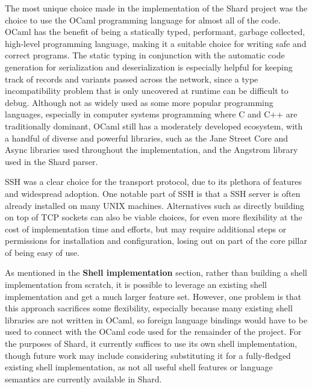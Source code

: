 \documentclass[twoside]{report}
\newcommand{\todoi}[1]{\todo[inline, color=blue!20]{TODO: {#1}}}
\begin{document}
The most unique choice made in the implementation of the Shard project was the choice to use the OCaml programming language for almost all of the code.
OCaml has the benefit of being a statically typed, performant, garbage collected, high-level programming language, making it a suitable choice for writing safe and correct programs.
The static typing in conjunction with the automatic code generation for serialization and deserialization is especially helpful for keeping track of records and variants passed across the network, since a type incompatibility problem that is only uncovered at runtime can be difficult to debug.
Although not as widely used as some more popular programming languages, especially in computer systems programming where C and C++ are traditionally dominant, OCaml still has a moderately developed ecosystem, with a handful of diverse and powerful libraries, such as the Jane Street Core and Async libraries used throughout the implementation, and the Angstrom library used in the Shard parser.

SSH was a clear choice for the transport protocol, due to its plethora of features and widespread adoption.
One notable part of SSH is that a SSH server is often already installed on many UNIX machines.
Alternatives such as directly building on top of TCP sockets can also be viable choices, for even more flexibility at the cost of implementation time and efforts, but may require additional steps or permissions for installation and configuration, losing out on part of the core pillar of being easy of use.

As mentioned in the \textbf{Shell implementation} section, rather than building a shell implementation from scratch, it is possible to leverage an existing shell implementation and get a much larger feature set.
However, one problem is that this approach sacrifices some flexibility, especially because many existing shell libraries are not written in OCaml, so foreign language bindings would have to be used to connect with the OCaml code used for the remainder of the project.
For the purposes of Shard, it currently suffices to use its own shell implementation, though future work may include considering substituting it for a fully-fledged existing shell implementation, as not all useful shell features or language semantics are currently available in Shard.
\end{document}

